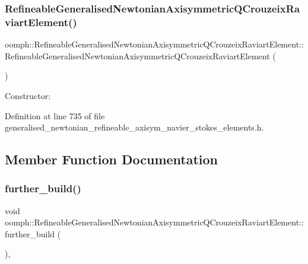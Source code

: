 \subsubsection{\texorpdfstring{Refineable\+Generalised\+Newtonian\+Axisymmetric\+Q\+Crouzeix\+Raviart\+Element()}{RefineableGeneralisedNewtonianAxisymmetricQCrouzeixRaviartElement()}}
{\footnotesize\ttfamily oomph\+::\+Refineable\+Generalised\+Newtonian\+Axisymmetric\+Q\+Crouzeix\+Raviart\+Element\+::\+Refineable\+Generalised\+Newtonian\+Axisymmetric\+Q\+Crouzeix\+Raviart\+Element (\begin{DoxyParamCaption}{ }\end{DoxyParamCaption})\hspace{0.3cm}{\ttfamily [inline]}}



Constructor\+: 



Definition at line 735 of file generalised\+\_\+newtonian\+\_\+refineable\+\_\+axisym\+\_\+navier\+\_\+stokes\+\_\+elements.\+h.



\subsection{Member Function Documentation}
\mbox{\label{classoomph_1_1RefineableGeneralisedNewtonianAxisymmetricQCrouzeixRaviartElement_a56b98748492bec100b08532892d5ac7f}} 
\subsubsection{\texorpdfstring{further\+\_\+build()}{further\_build()}}
{\footnotesize\ttfamily void oomph\+::\+Refineable\+Generalised\+Newtonian\+Axisymmetric\+Q\+Crouzeix\+Raviart\+Element\+::further\+\_\+build (\begin{DoxyParamCaption}{ }\end{DoxyParamCaption})\hspace{0.3cm}{\ttfamily [inline]}, {\ttfamily [virtual]}}


